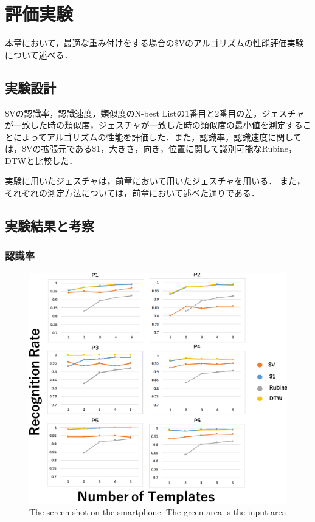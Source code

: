 \chapter{評価実験}
本章において，最適な重み付けをする場合の\$Vのアルゴリズムの性能評価実験について述べる．

\section{実験設計}
\$Vの認識率，認識速度，類似度のN-best Listの1番目と2番目の差，ジェスチャが一致した時の類似度，ジェスチャが一致した時の類似度の最小値を測定することによってアルゴリズムの性能を評価した．また，認識率，認識速度に関しては，\$Vの拡張元である\$1，大きさ，向き，位置に関して識別可能なRubine，DTWと比較した．

実験に用いたジェスチャは，前章において用いたジェスチャを用いる．
また，それぞれの測定方法については，前章において述べた通りである．

\section{実験結果と考察}
\subsection{認識率}
\begin{figure}[!h]
\centering
\includegraphics[width=1.0\columnwidth]{img/rec_rate.eps}
\caption{The screen shot on the smartphone. The green area is the input area}
\label{fig:rare_rec}
\end{figure}


